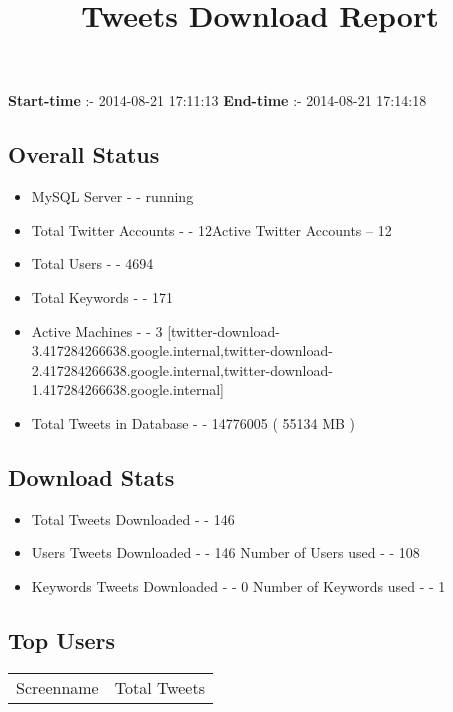 \documentclass{article}\usepackage[T1]{fontenc}
\begin{document}
\title{\textbf{Tweets Download Report}}
               \date{}
                \maketitle
               \centerline{\textbf{Start-time} :- 2014-08-21 17:11:13 \hspace{40pt} \textbf{End-time} :- 2014-08-21 17:14:18}               \subsection*{Overall Status}                \begin{itemize}                \item MySQL Server - - running               \item Total Twitter Accounts - - 12\newline Active Twitter Accounts -- 12               \item Total Users - - 4694               \item Total Keywords - - 171               \item Active Machines - - 3 [twitter-download-3.417284266638.google.internal,twitter-download-2.417284266638.google.internal,twitter-download-1.417284266638.google.internal]               \item Total Tweets in Database - - 14776005 ( 55134 MB )               \end{itemize}               \subsection*{Download Stats}                \begin{itemize}                \item Total Tweets Downloaded - - 146               \item Users Tweets Downloaded - - 146 \newline Number of Users used - - 108               \item Keywords Tweets Downloaded - - 0 \newline Number of Keywords used - - 1              \end{itemize}              \subsection*{Top Users}\begin{tabular}{|c|c|}         \hline         Screenname & Total Tweets \\ 

\end{tabular}
\end{document}

